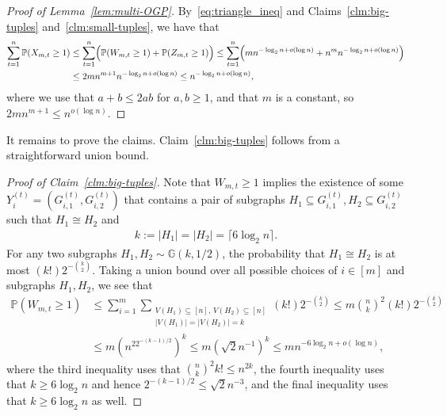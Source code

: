 \documentclass[11pt]{article}
\theoremstyle{plain}
\theoremstyle{definition}
\theoremstyle{remark}
\renewcommand{\Pr}{\mathbb{P}}
\begin{document}
\begin{proof}[Proof of Lemma~\ref{lem:multi-OGP}]
    By~\eqref{eq:triangle_ineq} and Claims~\ref{clm:big-tuples} and~\ref{clm:small-tuples}, we have that  
    \begin{align*}
        \sum_{t=1}^n \Pr(X_{m,t} \geq 1) &\leq \sum_{t=1}^n \Bigl(\Pr(W_{m,t} \geq 1) + \Pr(Z_{m,t} \geq 1)\Bigr) \notag 
        \leq \sum_{t=1}^n \Bigl(mn^{-\log_2 n + o(\log n)} + n^m n^{-\log_2 n + o(\log n)}\Bigr) \notag \\
        &\leq 2mn^{m+1} n^{-\log_2 n + o(\log n)} 
        \leq n^{-\log_2 n + o(\log n)},
    \end{align*}
    where we use that $a + b \leq 2ab$ for $a, b \geq 1$, and that $m$ is a constant, so $2m n^{m+1} \leq n^{o(\log n)}$.
\end{proof}

It remains to prove the claims. Claim~\ref{clm:big-tuples} follows from a straightforward union bound.

\begin{proof}[Proof of Claim~\ref{clm:big-tuples}]
    Note that $W_{m,t} \geq 1$ implies the existence of some $Y_i^{(t)} = \left(G_{i,1}^{(t)}, G_{i,2}^{(t)}\right)$ that contains a pair of subgraphs $H_1 \subseteq G_{i,1}^{(t)}, H_2 \subseteq G_{i,2}^{(t)}$ such that $H_1 \cong H_2$ and
    \begin{align*}
        k := |H_1| = |H_2| = \lceil 6\log_2 n \rceil.
    \end{align*}
    For any two subgraphs $H_1, H_2 \sim \mathbb{G}(k, 1/2)$, the probability that $H_1 \cong H_2$ is at most $(k!)2^{-\binom{k}{2}}$. Taking a union bound over all possible choices of $i \in [m]$ and subgraphs $H_1, H_2$, we see that
    \begin{align*}
        \Pr(W_{m,t} \geq 1) &\leq \sum_{i=1}^m \sum_{\substack{V(H_1) \subseteq [n], \, V(H_2) \subseteq [n] \\ |V(H_1)| = |V(H_2)| = k}} (k!) 2^{-\binom{k}{2}} 
        \leq m \binom{n}{k}^2 (k!) 2^{- \binom{k}{2}} \\
        &\leq m \left(n^22^{-(k-1)/2}\right)^k  
        \leq m \left(\sqrt{2} n^{-1}\right)^k 
        \leq m n^{-6\log_2 n + o(\log n)},
    \end{align*}
    where the third inequality uses that 
    $\binom{n}{k}^{2} k! \leq n^{2k}$, 
    the fourth inequality uses that $k \geq 6 \log_{2} n$ and hence $2^{-(k-1)/2} \leq \sqrt{2} n^{-3}$, 
    and the final inequality uses that $k \geq 6 \log_{2} n$ as well. 
\end{proof}
\end{document}
